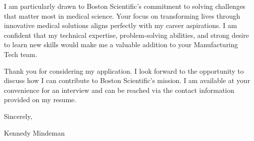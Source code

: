 \documentclass[letterpaper,11pt]{article}
\begin{document}
I am particularly drawn to Boston Scientific's commitment to solving challenges that matter most in medical science. Your focus on transforming lives through innovative medical solutions aligns perfectly with my career aspirations. I am confident that my technical expertise, problem-solving abilities, and strong desire to learn new skills would make me a valuable addition to your Manufacturing Tech team.

Thank you for considering my application. I look forward to the opportunity to discuss how I can contribute to Boston Scientific's mission. I am available at your convenience for an interview and can be reached via the contact information provided on my resume.

Sincerely,

Kennedy Mindeman
\end{document}
